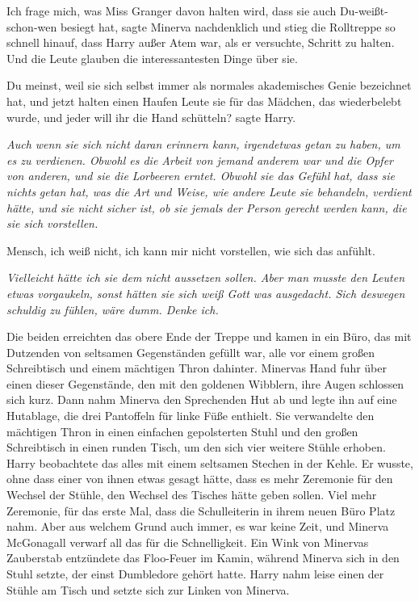 \glqq{}Ich frage mich, was Miss Granger davon halten wird, dass sie auch
Du-weißt-schon-wen besiegt hat\grqq{}, sagte Minerva nachdenklich und stieg die
Rolltreppe so schnell hinauf, dass Harry außer Atem war, als er versuchte,
Schritt zu halten. \glqq{}Und die Leute glauben die interessantesten Dinge über
sie.\grqq{}

\glqq{}Du meinst, weil sie sich selbst immer als normales akademisches Genie
bezeichnet hat, und jetzt halten einen Haufen Leute sie für das Mädchen, das
wiederbelebt wurde, und jeder will ihr die Hand schütteln?\grqq{} sagte Harry.

\emph{Auch wenn sie sich nicht daran erinnern kann, irgendetwas getan zu haben,
um es zu verdienen. Obwohl es die Arbeit von jemand anderem war und die Opfer
von anderen, und sie die Lorbeeren erntet. Obwohl sie das Gefühl hat, dass sie
nichts} \emph{getan hat, was die Art und Weise, wie andere Leute sie behandeln,
verdient hätte, und sie nicht sicher ist, ob sie jemals der Person gerecht
werden kann, die sie sich vorstellen.}

\glqq{}Mensch, ich weiß nicht, ich kann mir nicht vorstellen, wie sich das
anfühlt.\grqq{}

\emph{Vielleicht hätte ich sie dem nicht aussetzen sollen. Aber man musste den
Leuten etwas vorgaukeln, sonst hätten sie sich weiß Gott was ausgedacht. Sich
deswegen schuldig zu fühlen, wäre dumm. Denke ich.}

Die beiden erreichten das obere Ende der Treppe und kamen in ein Büro, das mit
Dutzenden von seltsamen Gegenständen gefüllt war, alle vor einem großen
Schreibtisch und einem mächtigen Thron dahinter. Minervas Hand fuhr über einen
dieser Gegenstände, den mit den goldenen Wibblern, ihre Augen schlossen sich
kurz. Dann nahm Minerva den Sprechenden Hut ab und legte ihn auf eine Hutablage,
die drei Pantoffeln für linke Füße enthielt. Sie verwandelte den mächtigen Thron
in einen einfachen gepolsterten Stuhl und den großen Schreibtisch in einen
runden Tisch, um den sich vier weitere Stühle erhoben. Harry beobachtete das
alles mit einem seltsamen Stechen in der Kehle. Er wusste, ohne dass einer von
ihnen etwas gesagt hätte, dass es mehr Zeremonie für den Wechsel der Stühle, den
Wechsel des Tisches hätte geben sollen. Viel mehr Zeremonie, für das erste Mal,
dass die Schulleiterin in ihrem neuen Büro Platz nahm. Aber aus welchem Grund
auch immer, es war keine Zeit, und Minerva McGonagall verwarf all das für die
Schnelligkeit. Ein Wink von Minervas Zauberstab entzündete das Floo-Feuer im
Kamin, während Minerva sich in den Stuhl setzte, der einst Dumbledore gehört
hatte. Harry nahm leise einen der Stühle am Tisch und setzte sich zur Linken von
Minerva.

